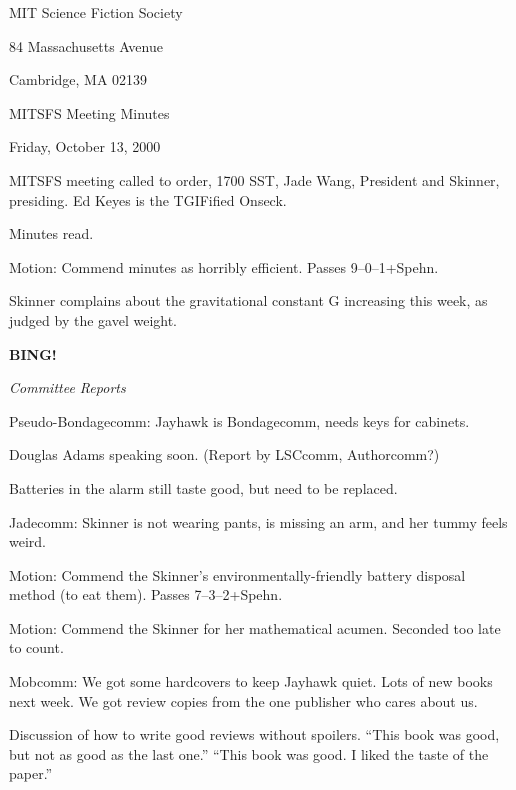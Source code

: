 \documentclass[12pt]{article}
\newcommand{\bing}{{\bf BING!} }
\newcommand{\goto}[1]{\bing \vskip 12pt \centerline{{\em{#1}}}}
\begin{document}
\begin{center}

MIT Science Fiction Society 

84 Massachusetts Avenue

Cambridge, MA 02139

\vspace{12pt}

MITSFS Meeting Minutes 

Friday, October 13, 2000

\end{center}
 
\vspace{18pt}

\setlength{\parskip}{6pt}

\noindent
MITSFS meeting called to order, 1700 SST, Jade Wang, President and
Skinner, presiding.  Ed Keyes is the TGIFified Onseck.

Minutes read.

Motion: Commend minutes as horribly efficient.  Passes 9--0--1+Spehn.

Skinner complains about the gravitational constant G increasing this
week, as judged by the gavel weight.

\goto{Committee Reports}

Pseudo-Bondagecomm: Jayhawk is Bondagecomm, needs keys for cabinets.


Douglas Adams speaking soon.  (Report by LSCcomm, Authorcomm?)

Batteries in the alarm still taste good, but need to be replaced.

Jadecomm: Skinner is not wearing pants, is missing an arm, and her
tummy feels weird.

Motion: Commend the Skinner's environmentally-friendly battery disposal
method (to eat them).  Passes 7--3--2+Spehn.

Motion: Commend the Skinner for her mathematical acumen.  Seconded too
late to count.

Mobcomm: We got some hardcovers to keep Jayhawk quiet.  Lots of new books
next week.  We got review copies from the one publisher who cares about
us.

Discussion of how to write good reviews without spoilers.  ``This book
was good, but not as good as the last one.''  ``This book was good.
I liked the taste of the paper.''
\end{document}
